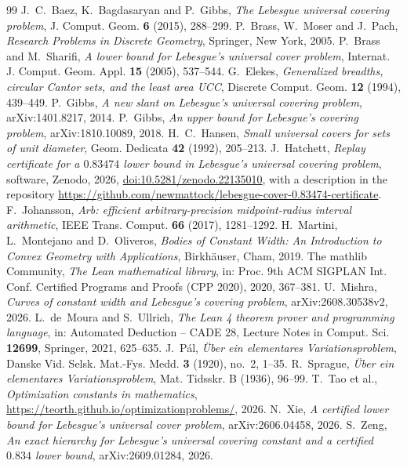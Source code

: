 \documentclass[11pt]{amsart}
\theoremstyle{definition}
\theoremstyle{remark}
\numberwithin{equation}{section}
\begin{document}
\begin{thebibliography}{99}
 J.~C.~Baez, K.~Bagdasaryan and P.~Gibbs, \emph{The Lebesgue universal covering problem}, J. Comput. Geom. \textbf{6} (2015), 288--299.
 P.~Brass, W.~Moser and J.~Pach, \emph{Research Problems in Discrete Geometry}, Springer, New York, 2005.
 P.~Brass and M.~Sharifi, \emph{A lower bound for Lebesgue's universal cover problem}, Internat. J. Comput. Geom. Appl. \textbf{15} (2005), 537--544.
 G.~Elekes, \emph{Generalized breadths, circular Cantor sets, and the least area UCC}, Discrete Comput. Geom. \textbf{12} (1994), 439--449.
 P.~Gibbs, \emph{A new slant on Lebesgue's universal covering problem}, arXiv:1401.8217, 2014.
 P.~Gibbs, \emph{An upper bound for Lebesgue's covering problem}, arXiv:1810.10089, 2018.
 H.~C.~Hansen, \emph{Small universal covers for sets of unit diameter}, Geom. Dedicata \textbf{42} (1992), 205--213.
 J.~Hatchett, \emph{Replay certificate for a $0.83474$ lower bound in Lebesgue's universal covering problem}, software, Zenodo, 2026, \href{https://doi.org/10.5281/zenodo.22135010}{doi:10.5281/zenodo.22135010}, with a description in the repository \url{https://github.com/newmattock/lebesgue-cover-0.83474-certificate}.
 F.~Johansson, \emph{Arb: efficient arbitrary-precision midpoint-radius interval arithmetic}, IEEE Trans. Comput. \textbf{66} (2017), 1281--1292.
 H.~Martini, L.~Montejano and D.~Oliveros, \emph{Bodies of Constant Width: An Introduction to Convex Geometry with Applications}, Birkh\"auser, Cham, 2019.
 The mathlib Community, \emph{The Lean mathematical library}, in: Proc. 9th ACM SIGPLAN Int. Conf. Certified Programs and Proofs (CPP 2020), 2020, 367--381.
 U.~Mishra, \emph{Curves of constant width and Lebesgue's covering problem}, arXiv:2608.30538v2, 2026.
 L.~de~Moura and S.~Ullrich, \emph{The Lean 4 theorem prover and programming language}, in: Automated Deduction -- CADE 28, Lecture Notes in Comput. Sci. \textbf{12699}, Springer, 2021, 625--635.
 J.~P\'al, \emph{\"Uber ein elementares Variationsproblem}, Danske Vid. Selsk. Mat.-Fys. Medd. \textbf{3} (1920), no.~2, 1--35.
 R.~Sprague, \emph{\"Uber ein elementares Variationsproblem}, Mat. Tidsskr. B (1936), 96--99.
 T.~Tao et al., \emph{Optimization constants in mathematics}, \url{https://teorth.github.io/optimizationproblems/}, 2026.
 N.~Xie, \emph{A certified lower bound for Lebesgue's universal cover problem}, arXiv:2606.04458, 2026.
 S.~Zeng, \emph{An exact hierarchy for Lebesgue's universal covering constant and a certified $0.834$ lower bound}, arXiv:2609.01284, 2026.
\end{thebibliography}
\end{document}
